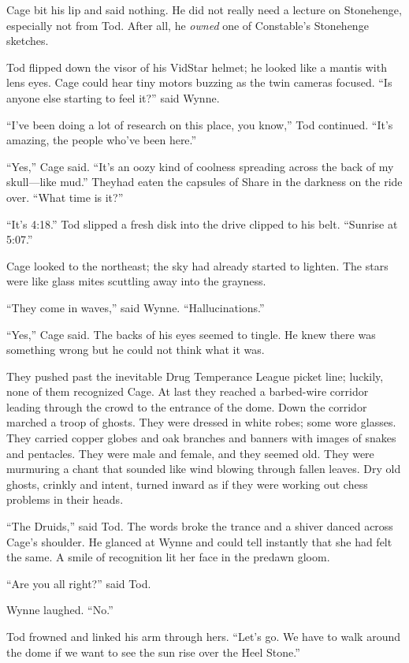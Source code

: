 Cage bit his lip and said nothing. He did not really need a lecture on Stonehenge, especially not from Tod. After all, he \textit{owned} one of Constable's Stonehenge sketches.

Tod flipped down the visor of his VidStar helmet; he looked like a mantis with lens eyes. Cage could hear tiny motors buzzing as the twin cameras focused. ``Is anyone else starting to feel it?'' said Wynne.

``I've been doing a lot of research on this place, you know,'' Tod continued. ``It's amazing, the people who've been here.''

``Yes,'' Cage said. ``It's an oozy kind of coolness spreading across the back of my skull---like mud.'' Theyhad eaten the capsules of Share in the darkness on the ride over. ``What time is it?''

``It's 4:18.'' Tod slipped a fresh disk into the drive clipped to his belt. ``Sunrise at 5:07.''

Cage looked to the northeast; the sky had already started to lighten. The stars were like glass mites scuttling away into the grayness.

``They come in waves,'' said Wynne. ``Hallucinations.''

``Yes,'' Cage said. The backs of his eyes seemed to tingle. He knew there was something wrong but he could not think what it was.

They pushed past the inevitable Drug Temperance League picket line; luckily, none of them recognized Cage. At last they reached a barbed-wire corridor leading through the crowd to the entrance of the dome. Down the corridor marched a troop of ghosts. They were dressed in white robes; some wore glasses. They carried copper globes and oak branches and banners with images of snakes and pentacles. They were male and female, and they seemed old. They were murmuring a chant that sounded like wind blowing through fallen leaves. Dry old ghosts, crinkly and intent, turned inward as if they were working out chess problems in their heads.

``The Druids,'' said Tod. The words broke the trance and a shiver danced across Cage's shoulder. He glanced at Wynne and could tell instantly that she had felt the same. A smile of recognition lit her face in the predawn gloom.

``Are you all right?'' said Tod.

Wynne laughed. ``No.''

Tod frowned and linked his arm through hers. ``Let's go. We have to walk around the dome if we want to see the sun rise over the Heel Stone.''

